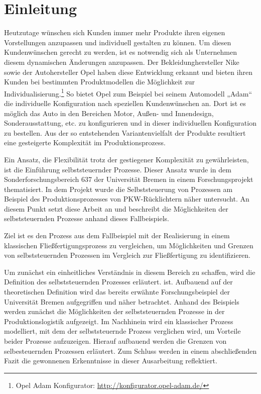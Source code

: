 \section{Einleitung}
\label{sec:Einleitung}
Heutzutage wünschen sich Kunden immer mehr Produkte ihren eigenen Vorstellungen
anzupassen und individuell gestalten zu können. Um diesen Kundenwünschen gerecht
zu werden, ist es notwendig sich als Unternehmen diesem dynamischen Änderungen
anzupassen.  Der Bekleidunghersteller Nike sowie der Autohersteller Opel haben
diese Entwicklung erkannt und bieten ihren Kunden bei bestimmten Produktmodellen
die Möglichkeit zur Individualisierung.\footnote{Opel Adam Konfigurator:
\url{http://konfigurator.opel-adam.de/}} So bietet Opel zum Beispiel bei seinem
Automodell „Adam“ die individuelle Konfiguration nach speziellen Kundenwünschen
an. Dort ist es möglich das Auto in den Bereichen Motor, Außen- und Innendesign,
Sonderausstattung, etc. zu konfigurieren und in dieser individuellen
Konfiguration zu bestellen. Aus der so entstehenden Variantenvielfalt der
Produkte resultiert eine gesteigerte Komplexität im Produktionsprozess.

Ein Ansatz, die Flexibilität trotz der gestiegener Komplexität zu gewährleisten,
ist die Einführung selbststeuernder Prozesse. Dieser Ansatz wurde in dem
Sonderforschungsbereich 637 der Universität Bremen in einem Forschungsprojekt
thematisiert. In dem Projekt wurde die Selbststeuerung von Prozessen am Beispiel
des Produktionsprozesses von PKW-Rücklichtern näher untersucht. An diesem Punkt
setzt diese Arbeit an und beschreibt die Möglichkeiten der selbststeuernden
Prozesse anhand dieses Fallbeispiels.

Ziel ist es den Prozess aus dem Fallbeispiel mit der Realisierung in einem
klassischen Fließfertigungsprozess zu vergleichen, um Möglichkeiten und Grenzen
von selbststeuernden Prozessen im Vergleich zur Fließfertigung zu
identifizieren.

Um zunächst ein einheitliches Verständnis in diesem Bereich zu schaffen, wird
die Definition des selbststeuernden Prozesses erläutert. ist. Aufbauend auf der
theoretischen Definition wird das bereits erwähnte Forschungsbeispiel der
Universität Bremen aufgegriffen und näher betrachtet. Anhand des Beispiels
werden zunächst die Möglichkeiten der selbststeuernden Prozesse in der
Produktionslogistik aufgezeigt. Im Nachhinein wird ein klassischer Prozess
modelliert, mit dem der selbststeuernde Prozess verglichen wird, um Vorteile
beider Prozesse aufzuzeigen. Hierauf aufbauend werden die Grenzen von
selbesteuernden Prozessen erläutert. Zum Schluss werden in einem abschließenden
Fazit die gewonnenen Erkenntnisse in dieser Ausarbeitung reflektiert.

\clearpage
